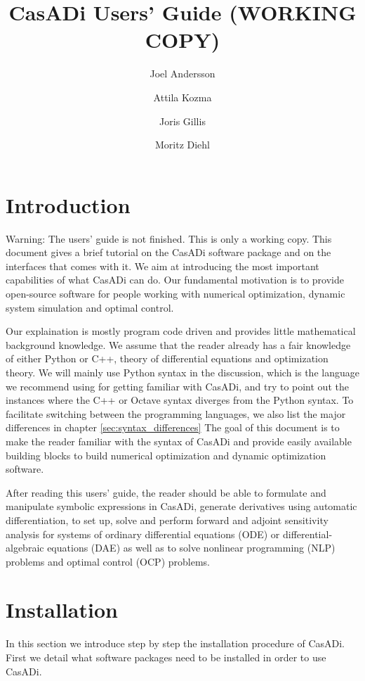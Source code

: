 \documentclass[a4paper,12pt]{book}
\author{Joel Andersson \and Attila Kozma \and Joris Gillis \and Moritz Diehl}
\title{CasADi Users' Guide {\color{red}(WORKING COPY)}}
\begin{document}
\titlepage
\maketitle
\begin{latexonly}
\tableofcontents
\end{latexonly}
\clearpage

\chapter{Introduction}
{\color{red}Warning: The users' guide is not finished. This is only a working copy.}
This document gives a brief tutorial on the CasADi software package and on the interfaces that comes with it. We aim at
introducing the most important capabilities of what CasADi can do. Our fundamental motivation is to provide open-source
software for people working with numerical optimization, dynamic system simulation and optimal control.

Our explaination is mostly program code driven and provides little mathematical background knowledge. We assume that the reader already has a fair knowledge of either Python or C++, theory of differential equations and optimization theory. We will mainly use Python syntax in the discussion, which is the language we recommend using for getting familiar with CasADi, and try to point out the instances where the C++ or Octave syntax diverges from the Python syntax. To facilitate switching between the programming languages, we also list the major differences in chapter \ref{sec:syntax_differences}
The goal of this document is to make the reader familiar with the syntax of CasADi and provide easily available building blocks to build numerical optimization and dynamic optimization software.

After reading this users' guide, the reader should be able to formulate and manipulate symbolic expressions in CasADi, generate derivatives using automatic differentiation, to set up, solve and perform forward and adjoint sensitivity analysis for systems of ordinary differential equations (ODE) or differential-algebraic equations (DAE) as well as to solve nonlinear programming (NLP) problems and optimal control (OCP) problems.

\chapter{Installation}
In this section we introduce step by step the installation procedure of CasADi. First we detail what software packages need to
be installed in order to use CasADi.
\end{document}
